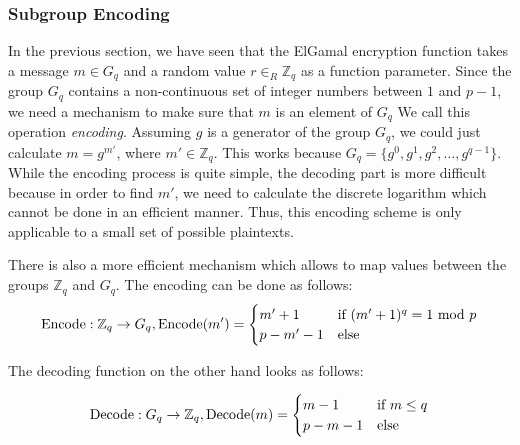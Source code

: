 \documentclass[numbers=noenddot, abstract=on, a4paper, headsepline,
footsepline, oneside, draft=off]{scrreprt}
\begin{document}
\subsubsection{Subgroup Encoding}
\label{sec:subgroupencoding}
In the previous section, we have seen that the ElGamal encryption function takes
a message $m \in G_q$ and a random value $r \in_R \mathbb{Z}_q$ as a function
parameter. Since the group $G_q$ contains a non-continuous set of integer numbers
between $1$ and $p-1$, we need a mechanism to make sure that $m$ is an element
of $G_q$ We call this operation \textit{encoding}.
Assuming $g$ is a generator of the group $G_q$, we could just calculate
$m=g^{m'}$, where $m' \in \mathbb{Z}_q$. This works because $G_q = \{g^0, g^1,
g^2, \ldots, g^{q-1}\}$. While the encoding process is quite simple, the
decoding part is more difficult because in order to find $m'$, we need to
calculate the discrete logarithm which cannot be done in an efficient manner.
Thus, this encoding scheme is only applicable to a small set of possible
plaintexts.

There is also a more efficient mechanism which allows to
map values between the groups $\mathbb{Z}_q$ and $G_q$. The encoding can be done
as follows:
\begin{equation}
\text{Encode} : \mathbb{Z}_q \rightarrow G_q, \text{Encode}(m') = 
	\begin{cases}
	m'+1 & \text{if } (m'+1)^q = 1 \text{ mod } p \\
	p-m'-1 & \text{else}
	\end{cases} \notag
\end{equation}

The decoding function on the other hand looks as follows:

\begin{equation}
\text{Decode} : G_q \rightarrow \mathbb{Z}_q, \text{Decode}(m) = 
	\begin{cases}
	m-1 & \text{if } m \leq q \\
	p-m-1 & \text{else}
	\end{cases} \notag
\end{equation}
\end{document}
